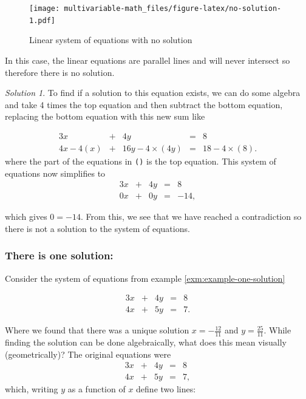 \documentclass[
]{book}
\theoremstyle{definition}
\theoremstyle{definition}
\theoremstyle{definition}
\theoremstyle{definition}
\theoremstyle{remark}
\newtheorem*{solution}{Solution}
\begin{document}
\begin{figure}
\centering
\texttt{[image: multivariable-math\_files/figure-latex/no-solution-1.pdf]}
\caption{\label{fig:no-solution}Linear system of equations with no solution}
\end{figure}

In this case, the linear equations are parallel lines and will never intersect so therefore there is no solution.

\begin{solution}
To find if a solution to this equation exists, we can do some algebra and take 4 times the top equation and then subtract the bottom equation, replacing the bottom equation with this new sum like

\begin{alignat*}{3}
x   & {}+{} & 4 y & {}={} & 8 \\
4 x  - 4(x) & {}+{} & 16 y - 4\times (4 y) & {}={} & 18 - 4 \times (8).
\end{alignat*}
where the part of the equations in \texttt{()} is the top equation. This system of equations now simplifies to
\begin{alignat*}{3}
x & {}+{} & 4 y & {}={} & 8 \\
0 x & {}+{} &  0 y & {}={} & -14,
\end{alignat*}

which gives \(0 = -14\). From this, we see that we have reached a contradiction so there is not a solution to the system of equations.
\end{solution}

\hypertarget{there-is-one-solution}{%
\subsubsection{There is one solution:}\label{there-is-one-solution}}

Consider the system of equations from example \ref{exm:example-one-solution}

\begin{alignat*}{3}
x   & {}+{} & 4 y & {}={} & 8 \\
4 x & {}+{} & 5 y & {}={} & 7.
\end{alignat*}

Where we found that there was a unique solution \(x = -\frac{12}{11}\) and \(y = \frac{25}{11}\). While finding the solution can be done algebraically, what does this mean visually (geometrically)? The original equations were
\begin{alignat*}{3}
x   & {}+{} & 4 y & {}={} & 8 \\
4 x & {}+{} & 5 y & {}={} & 7,
\end{alignat*}
which, writing \(y\) as a function of \(x\) define two lines:
\end{document}
